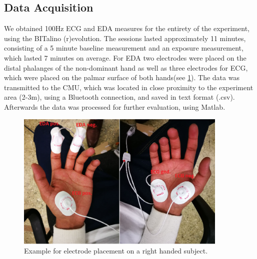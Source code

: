 %

\subsection{Data Acquisition}
We obtained 100Hz ECG and EDA measures for the entirety of the experiment, using the BITalino (r)evolution. The sessions lasted approximately 11 minutes, consisting of a 5 minute baseline measurement and an exposure measurement, which lasted 7 minutes on average. For EDA two electrodes were placed on the distal phalanges of the non-dominant hand as well as three electrodes for ECG, which were placed on the palmar surface of both hands(see \ref{epImg}). The data was transmitted to the CMU, which was located in close proximity to the experiment area (2-3m), using a Bluetooth connection, and saved in text format (.csv). Afterwards the data was processed for further evaluation, using Matlab.

\begin{figure}[ht]
\centering
\includegraphics[width=0.9\textwidth]{images/ep.png}
\caption{Example for electrode placement on a right handed subject.}
\label{epImg}
\end{figure}

